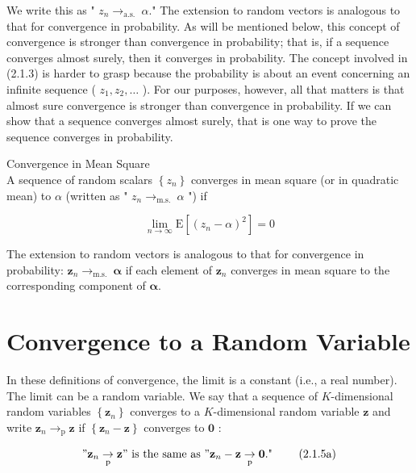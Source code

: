 \documentclass[10pt]{article}
\begin{document}
We write this as " $z_{n} \rightarrow_{\text {a.s. }} \alpha$." The extension to random vectors is analogous to that for convergence in probability. As will be mentioned below, this concept of convergence is stronger than convergence in probability; that is, if a sequence converges almost surely, then it converges in probability. The concept involved in (2.1.3) is harder to grasp because the probability is about an event concerning an infinite sequence ( $z_{1}, z_{2}, \ldots$ ). For our purposes, however, all that matters is that almost sure convergence is stronger than convergence in probability. If we can show that a sequence converges almost surely, that is one way to prove the sequence converges in probability.

Convergence in Mean Square\\
A sequence of random scalars $\left\{z_{n}\right\}$ converges in mean square (or in quadratic mean) to $\alpha$ (written as " $z_{n} \rightarrow_{\text {m.s. }} \alpha$ ") if


\begin{equation*}
\lim _{n \rightarrow \infty} \mathrm{E}\left[\left(z_{n}-\alpha\right)^{2}\right]=0 \tag{2.1.4}
\end{equation*}


The extension to random vectors is analogous to that for convergence in probability: $\mathbf{z}_{n} \rightarrow_{\text {m.s. }} \boldsymbol{\alpha}$ if each element of $\mathbf{z}_{n}$ converges in mean square to the corresponding component of $\boldsymbol{\alpha}$.

\section*{Convergence to a Random Variable}
In these definitions of convergence, the limit is a constant (i.e., a real number). The limit can be a random variable. We say that a sequence of $K$-dimensional random variables $\left\{\mathbf{z}_{n}\right\}$ converges to a $K$-dimensional random variable $\mathbf{z}$ and write $\mathbf{z}_{n} \rightarrow_{\mathrm{p}} \mathbf{z}$ if $\left\{\mathbf{z}_{n}-\mathbf{z}\right\}$ converges to $\mathbf{0}$ :


\begin{equation*}
" \mathbf{z}_{n} \underset{\mathrm{p}}{\rightarrow} \mathbf{z} " \text { is the same as } " \mathbf{z}_{n}-\mathbf{z} \underset{\mathrm{p}}{\rightarrow} \mathbf{0} \text {." } \tag{2.1.5a}
\end{equation*}
\end{document}
